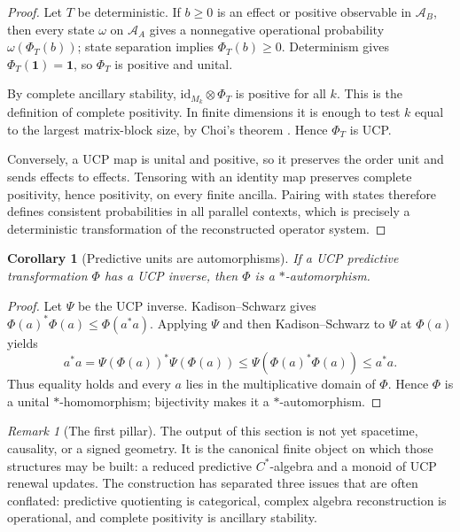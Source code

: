 \documentclass[11pt]{article}
\newtheorem{corollary}[theorem]{Corollary}
\theoremstyle{definition}
\theoremstyle{remark}
\newtheorem{remark}[theorem]{Remark}
\newcommand{\one}{\mathbf 1}
\newcommand{\id}{\mathrm{id}}
\newcommand{\A}{\mathcal A}
\begin{document}
\begin{proof}
Let $T$ be deterministic.  If $b\ge0$ is an effect or positive observable in
$\A_B$, then every state $\omega$ on $\A_A$ gives a nonnegative operational
probability $\omega(\Phi_T(b))$; state separation implies
$\Phi_T(b)\ge0$.  Determinism gives $\Phi_T(\one)=\one$, so $\Phi_T$ is positive
and unital.

By complete ancillary stability, $\id_{M_k}\otimes\Phi_T$ is positive for all
$k$.  This is the definition of complete positivity.  In finite dimensions it
is enough to test $k$ equal to the largest matrix-block size, by Choi's theorem
\cite{Choi1975}.  Hence $\Phi_T$ is UCP.

Conversely, a UCP map is unital and positive, so it preserves the order unit
and sends effects to effects.  Tensoring with an identity map preserves
complete positivity, hence positivity, on every finite ancilla.  Pairing with
states therefore defines consistent probabilities in all parallel contexts,
which is precisely a deterministic transformation of the reconstructed
operator system.
\end{proof}

\begin{corollary}[Predictive units are automorphisms]
\label{cor:units-automorphisms}
If a UCP predictive transformation $\Phi$ has a UCP inverse, then $\Phi$ is a
$*$-automorphism.
\end{corollary}

\begin{proof}
Let $\Psi$ be the UCP inverse.  Kadison--Schwarz gives
$\Phi(a)^*\Phi(a)\le\Phi(a^*a)$.  Applying $\Psi$ and then Kadison--Schwarz to
$\Psi$ at $\Phi(a)$ yields
\[
 a^*a=\Psi(\Phi(a))^*\Psi(\Phi(a))
 \le\Psi(\Phi(a)^*\Phi(a))\le a^*a.
\]
Thus equality holds and every $a$ lies in the multiplicative domain of
$\Phi$.  Hence $\Phi$ is a unital $*$-homomorphism; bijectivity makes it a
$*$-automorphism.
\end{proof}

\begin{remark}[The first pillar]
The output of this section is not yet spacetime, causality, or a signed
geometry.  It is the canonical finite object on which those structures may be
built: a reduced predictive $C^*$-algebra and a monoid of UCP renewal updates.
The construction has separated three issues that are often conflated:
predictive quotienting is categorical, complex algebra reconstruction is
operational, and complete positivity is ancillary stability.
\end{remark}
\end{document}
